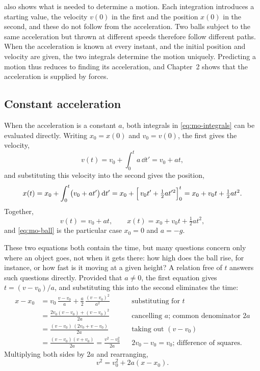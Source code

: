  also shows what is needed to determine a motion.
Each integration introduces a starting value, the velocity $v(0)$ in the
first and the position $x(0)$ in the second, and these do not follow from
the acceleration. Two balls subject to the same acceleration but thrown
at different speeds therefore follow different paths. When the
acceleration is known at every instant, and the initial position and
velocity are given, the two integrals determine the motion uniquely.
Predicting a motion thus reduces to finding its acceleration, and
Chapter~2 shows that the acceleration is supplied by forces.

\subsection*{Constant acceleration}

When the acceleration is a constant $a$, both integrals in
\cref{eq:mo-integrals} can be evaluated directly. Writing $x_0 = x(0)$ and
$v_0 = v(0)$, the first gives the velocity,
\begin{equation*}
   v(t) = v_0 + \int_0^t a\,\dd t' = v_0 + at ,
\end{equation*}
and substituting this velocity into the second gives the position,
\begin{equation*}
   x(t) = x_0 + \int_0^t \bigl(v_0 + a t'\bigr)\,\mathrm{d} t'
   = x_0 + \Bigl[\, v_0 t' + \tfrac12 a t'^2 \Bigr]_0^t
   = x_0 + v_0 t + \tfrac12 a t^2 .
\end{equation*}
Together,
\begin{equation}
   v(t) = v_0 + at, \qquad x(t) = x_0 + v_0 t + \tfrac12 a t^2 ,
   \label{eq:mo-constant}
\end{equation}
and \cref{eq:mo-ball} is the particular case $x_0 = 0$ and $a = -g$.

These two equations both contain the time, but many questions concern only
where an object goes, not when it gets there: how high does the ball
rise, for instance, or how fast is it moving at a given height? A relation
free of $t$ answers such questions directly. Provided that $a \neq 0$, the
first equation gives $t = (v - v_0)/a$, and substituting this into the
second eliminates the time:
\begin{align*}
   x - x_0 &= v_0\,\frac{v - v_0}{a} + \frac{a}{2}\,
      \frac{(v - v_0)^2}{a^2}
      && \text{substituting for $t$}\\
   &= \frac{2v_0(v - v_0) + (v - v_0)^2}{2a}
      && \text{cancelling $a$; common denominator $2a$}\\
   &= \frac{(v - v_0)\,(2v_0 + v - v_0)}{2a}
      && \text{taking out $(v - v_0)$}\\
   &= \frac{(v - v_0)(v + v_0)}{2a} = \frac{v^2 - v_0^2}{2a}
      && \text{$2v_0 - v_0 = v_0$; difference of squares.}
\end{align*}
Multiplying both sides by $2a$ and rearranging,
\begin{equation}
   v^2 = v_0^2 + 2a(x - x_0) .
   \label{eq:mo-v2}
\end{equation}

